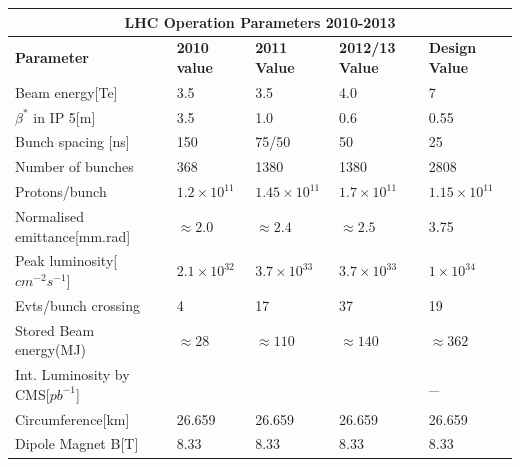 \begin{center}

\centering
  \begin{tabular}{|l|l|l|l|l|}
  \hline \hline
  \multicolumn{5}{|c|}{\bfseries{LHC Operation Parameters 2010-2013}} \\
  \hline \hline
  \bfseries{Parameter} & \bfseries{2010 value} & \bfseries{2011 Value} & \bfseries{2012/13 Value} & \bfseries{Design Value} \\
   \hline \hline
 Beam energy[Te] & 3.5  & 3.5  & 4.0  & 7 \\ 
  \hline
  $\beta^{\ast}$ in IP 5[m] & 3.5 & 1.0 & 0.6  & 0.55 \\
  \hline
  Bunch spacing [ns]& 150 & 75/50 & 50 & 25 \\
  \hline
  Number of bunches & 368 & 1380 & 1380 & 2808 \\
  \hline
  Protons/bunch  & $1.2 \times 10^{11}$ & $1.45 \times 10^{11}$ &  $1.7 \times 10^{11}$& $1.15 \times 10^{11}$ \\
  \hline
  Normalised emittance[mm.rad] & $\approx 2.0$ & $\approx 2.4$ & $\approx 2.5$ &  3.75\\
  \hline
  Peak luminosity[$cm^{-2}s^{-1}$]& $2.1 \times 10^{32}$ & $3.7 \times 10^{33}$ & $3.7 \times 10^{33}$ & $1 \times 10^{34}$ \\
  \hline
  Evts/bunch crossing & 4 & 17 & 37 &  19 \\
  \hline
  Stored Beam energy(MJ)& $\approx 28$ &  $\approx 110$  & $\approx 140$  & $\approx 362$ \\
  \hline
  Int. Luminosity by CMS[$pb^{-1}$]&  &  &  &  \_ \\
 \hline
 Circumference[km]  &26.659 & 26.659 & 26.659 & 26.659 \\
 \hline
 Dipole Magnet B[T] & 8.33 & 8.33 & 8.33 & 8.33 \\
 \hline  
  \end{tabular}
 \label{tableLHC}
 \end{center}


